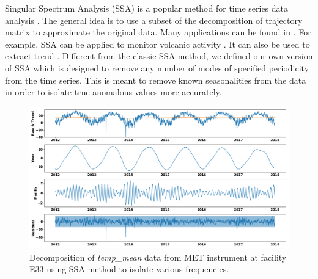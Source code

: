 Singular Spectrum Analysis (SSA) is a popular method for time series
data analysis \cite{golyandina2013singular,golyandina2014basic}. The
general idea is to use a subset of the decomposition of trajectory
matrix to approximate the original data. Many applications can be found
in \cite{golyandina2013singular}. For example, SSA can be applied to
monitor volcanic activity \cite{bozzo2010relationship}. It can also be
used to extract trend \cite{alexandrov2008method}. Different from the
classic SSA method, we defined our own version of SSA which is designed
to remove any number of modes of specified periodicity from the time
series. This is meant to remove known seasonalities from the data in 
order to isolate true anomalous values more accurately. 

\begin{figure}[ht]
    \centering
    \includegraphics[width=\textwidth]{figures/E33.png}
    \caption{Decomposition of \textit{temp\_mean} data from MET
		instrument at facility E33 using SSA method to isolate various
			frequencies.}
    \label{fig:ssa}
\end{figure}

